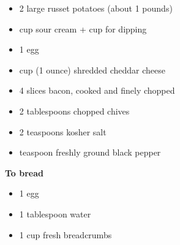 \begin{itemize}
  \item 2 large russet potatoes (about 1 pounds)
  \item {} cup sour cream +  cup for dipping
  \item 1 egg
  \item {} cup (1 ounce) shredded cheddar cheese
  \item 4 slices bacon, cooked and finely chopped
  \item 2 tablespoons chopped chives
  \item 2 teaspoons kosher salt
  \item {} teaspoon freshly ground black pepper
\end{itemize}\vspace{1ex}
{\bfseries To bread}
\begin{itemize}
  \item 1 egg
  \item 1 tablespoon water
  \item 1 cup fresh breadcrumbs
\end{itemize}


